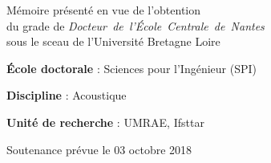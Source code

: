 \begin{cover}

  
  \noindent
  \begin{minipage}{8.9cm} %
    \noindent
    Mémoire présenté en vue de l'obtention \\ du grade de \mbox{\emph{Docteur de l'\'Ecole Centrale de Nantes}} \\sous le sceau de l'Université Bretagne Loire
    \bigskip

    \noindent
    \textbf{\'Ecole doctorale} : Sciences pour l'Ingénieur (SPI)
    \medskip

    \noindent
    \textbf{Discipline} : Acoustique
    \medskip

    \noindent
    \textbf{Unité de recherche} : UMRAE, Ifsttar
    \medskip

    \noindent
    Soutenance prévue le 03 octobre 2018
  \end{minipage}


  \begin{center}
    \scshape\color{titlecolor}%
    {\LARGE\bfseries\thesisTitle\bigskip}

  \end{center}


\end{cover}
